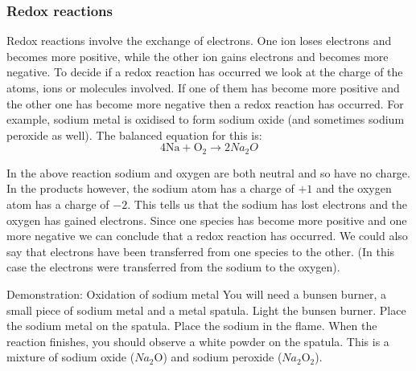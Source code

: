             \subsubsection{ Redox reactions}
            \nopagebreak
            \label{m38719*eip-585}Redox reactions involve the exchange of electrons. One ion loses electrons and becomes more positive, while the other ion gains electrons and becomes more negative. To decide if a redox reaction has occurred we look at the charge of the atoms, ions or molecules involved. If one of them has become more positive and the other one has become more negative then a redox reaction has occurred. For example, sodium metal is oxidised to form sodium oxide (and sometimes sodium peroxide as well). The balanced equation for this is:
\label{m38719*id624}\nopagebreak\noindent{}
    \begin{equation}
    4\mathrm{Na}+{\mathrm{O}}_{2}\to 2{Na}_{2}{O}\tag{17.27}
      \end{equation}
\par \label{m38719*eip-815}In the above reaction sodium and oxygen are both neutral and so have no charge. In the products however, the sodium atom has a charge of $+1$ and the oxygen atom has a charge of $-2$. This tells us that the sodium has lost electrons and the oxygen has gained electrons. Since one species has become more positive and one more negative we can conclude that a redox reaction has occurred. We could also say that electrons have been transferred from one species to the other. (In this case the electrons were transferred from the sodium to the oxygen).\par \label{m38719*eip-878}
            \begin{g_experiment}{Demonstration: Oxidation of sodium metal}
            \nopagebreak
            \label{m38719*eip-355}
You will need a bunsen burner, a small piece of sodium metal and a metal spatula. Light the bunsen burner. Place the sodium metal on the spatula. Place the sodium in the flame. When the reaction finishes, you should observe a white powder on the spatula. This is a mixture of sodium oxide (${Na}_{2}\mathrm{O}$) and sodium peroxide (${Na}_{2}{\mathrm{O}}_{2}$). 
\par \label{m38719*eip-980}
\end{g_experiment}
	\par
\label{m38719*eip-611}
